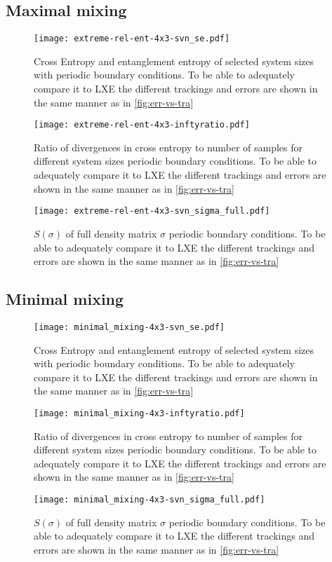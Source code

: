 \subsection{Maximal mixing}
\begin{figure}[H]
  \centering
  \texttt{[image: extreme-rel-ent-4x3-svn\_se.pdf]}
  \caption{Cross Entropy and entanglement entropy of selected system sizes with
  periodic boundary conditions. To be able to adequately compare it to LXE the
different trackings and errors are shown in the same manner as in
\cref{fig:err-vs-tra}}
  \label{fig:max_mix-svn_se-4x3}
\end{figure}
\begin{figure}[H]
  \centering
  \texttt{[image: extreme-rel-ent-4x3-inftyratio.pdf]}
  \caption{Ratio of divergences in cross entropy to number of samples for
    different system sizes
  periodic boundary conditions. To be able to adequately compare it to LXE the
different trackings and errors are shown in the same manner as in
\cref{fig:err-vs-tra}}
  \label{fig:max_mix-inftyratio-4x3}
\end{figure}
\begin{figure}[H]
  \centering
  \texttt{[image: extreme-rel-ent-4x3-svn\_sigma\_full.pdf]}
  \caption{$S(\sigma)$ of full density matrix $\sigma$ 
  periodic boundary conditions. To be able to adequately compare it to LXE the
different trackings and errors are shown in the same manner as in
\cref{fig:err-vs-tra}}
  \label{fig:max_mix-inftyratio-4x3}
\end{figure}
\subsection{Minimal mixing}
\begin{figure}[H]
  \centering
  \texttt{[image: minimal\_mixing-4x3-svn\_se.pdf]}
  \caption{Cross Entropy and entanglement entropy of selected system sizes with
  periodic boundary conditions. To be able to adequately compare it to LXE the
different trackings and errors are shown in the same manner as in
\cref{fig:err-vs-tra}}
  \label{fig:min_mix-svn_se-4x3}
\end{figure}
\begin{figure}[H]
  \centering
  \texttt{[image: minimal\_mixing-4x3-inftyratio.pdf]}
  \caption{Ratio of divergences in cross entropy to number of samples for
    different system sizes
  periodic boundary conditions. To be able to adequately compare it to LXE the
different trackings and errors are shown in the same manner as in
\cref{fig:err-vs-tra}}
  \label{fig:min_mix-inftyratio-4x3}
\end{figure}
\begin{figure}[H]
  \centering
  \texttt{[image: minimal\_mixing-4x3-svn\_sigma\_full.pdf]}
  \caption{$S(\sigma)$ of full density matrix $\sigma$ 
  periodic boundary conditions. To be able to adequately compare it to LXE the
different trackings and errors are shown in the same manner as in
\cref{fig:err-vs-tra}}
  \label{fig:min_mix-inftyratio-4x3}
\end{figure}
